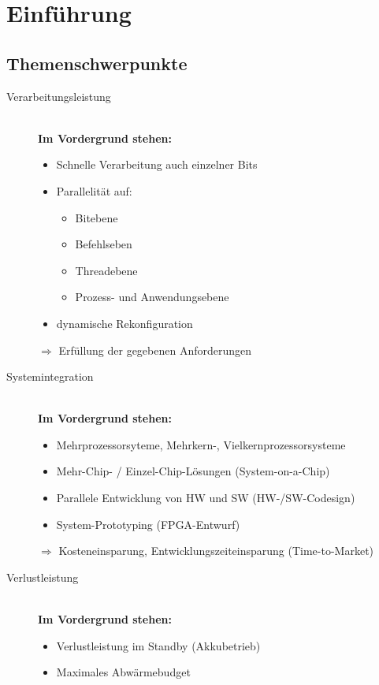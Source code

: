\chapter{Einführung}
\section{Themenschwerpunkte}
	\begin{description}

		\item[Verarbeitungsleistung]\hfill
			\\\textbf{Im Vordergrund stehen:}
			\begin{itemize}
				\item Schnelle Verarbeitung auch einzelner Bits
				\item Parallelität auf: \hfill
				\begin{itemize}
					\item Bitebene
					\item Befehlseben
					\item Threadebene
					\item Prozess- und Anwendungsebene
				\end{itemize}
				\item dynamische Rekonfiguration
			\end{itemize}
			$\Rightarrow$ Erfüllung der gegebenen Anforderungen
		
		\item[Systemintegration]\hfill
			\\\textbf{Im Vordergrund stehen:}
			\begin{itemize}
				\item Mehrprozessorsyteme, Mehrkern-, Vielkernprozessorsysteme
				\item Mehr-Chip- / Einzel-Chip-Lösungen (System-on-a-Chip)
				\item Parallele Entwicklung von HW und SW
	(HW-/SW-Codesign)
				\item System-Prototyping (FPGA-Entwurf)
			\end{itemize}
			$\Rightarrow$ Kosteneinsparung, Entwicklungszeiteinsparung (Time-to-Market)
		
		\item[Verlustleistung]
			\hfill\\\textbf{Im Vordergrund stehen:}
			\begin{itemize}
				\item Verlustleistung im Standby (Akkubetrieb)
				\item Maximales Abwärmebudget
			\end{itemize}
		

\end{description}

